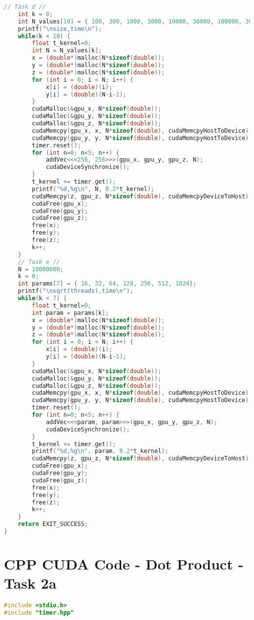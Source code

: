 \begin{appendix}
\begin{lstlisting}[language=C++, title=C++ Listing]
	// Task d //
	int k = 0;
	int N_values[10] = { 100, 300, 1000, 3000, 10000, 30000, 100000, 300000, 1000000, 3000000 };
	printf("\nsize,time\n");
	while(k < 10) {
		float t_kernel=0;
		int N = N_values[k];
		x = (double*)malloc(N*sizeof(double));
		y = (double*)malloc(N*sizeof(double));
		z = (double*)malloc(N*sizeof(double));
		for (int i = 0; i < N; i++) {
			x[i] = (double)(i);
			y[i] = (double)(N-i-1);
		}
		cudaMalloc(&gpu_x, N*sizeof(double)); 
		cudaMalloc(&gpu_y, N*sizeof(double));
		cudaMalloc(&gpu_z, N*sizeof(double));
		cudaMemcpy(gpu_x, x, N*sizeof(double), cudaMemcpyHostToDevice);
		cudaMemcpy(gpu_y, y, N*sizeof(double), cudaMemcpyHostToDevice);
		timer.reset();
		for (int n=0; n<5; n++) {
			addVec<<<256, 256>>>(gpu_x, gpu_y, gpu_z, N);
			cudaDeviceSynchronize();
		}
		t_kernel += timer.get();
		printf("%d,%g\n", N, 0.2*t_kernel);
		cudaMemcpy(z, gpu_z, N*sizeof(double), cudaMemcpyDeviceToHost);
		cudaFree(gpu_x);
		cudaFree(gpu_y);
		cudaFree(gpu_z);
		free(x);
		free(y);
		free(z);
		k++;
	}
	// Task e //
	N = 10000000;
	k = 0;
	int params[7] = { 16, 32, 64, 128, 256, 512, 1024};
	printf("\nsqrt(threads),time\n");
	while(k < 7) {
		float t_kernel=0;
		int param = params[k];
		x = (double*)malloc(N*sizeof(double));
		y = (double*)malloc(N*sizeof(double));
		z = (double*)malloc(N*sizeof(double));
		for (int i = 0; i < N; i++) {
			x[i] = (double)(i);
			y[i] = (double)(N-i-1);
		}
		cudaMalloc(&gpu_x, N*sizeof(double)); 
		cudaMalloc(&gpu_y, N*sizeof(double));
		cudaMalloc(&gpu_z, N*sizeof(double));
		cudaMemcpy(gpu_x, x, N*sizeof(double), cudaMemcpyHostToDevice);
		cudaMemcpy(gpu_y, y, N*sizeof(double), cudaMemcpyHostToDevice);
		timer.reset();
		for (int n=0; n<5; n++) {
			addVec<<<param, param>>>(gpu_x, gpu_y, gpu_z, N);
			cudaDeviceSynchronize();
		}
		t_kernel += timer.get();
		printf("%d,%g\n", param, 0.2*t_kernel);
		cudaMemcpy(z, gpu_z, N*sizeof(double), cudaMemcpyDeviceToHost);
		cudaFree(gpu_x);
		cudaFree(gpu_y);
		cudaFree(gpu_z);
		free(x);
		free(y);
		free(z);
		k++;
	}
	return EXIT_SUCCESS;
}
\end{lstlisting}
\pagebreak

\section{CPP CUDA Code - Dot Product - Task 2a}
\label{app_2a}
\begin{lstlisting}[language=C++, title=C++ Listing]
#include <stdio.h>
#include "timer.hpp"


\end{lstlisting}
\end{appendix}
